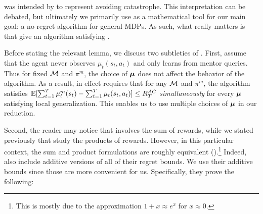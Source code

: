  was intended by \citet{plaut_avoiding_2024} to represent avoiding catastrophe. This interpretation can be debated, but ultimately we primarily use  as a mathematical tool for our main goal: a no-regret algorithm for general MDPs. As such, what really matters is that \citet{plaut_avoiding_2024} give an algorithm satisfying .



Before stating the relevant lemma, we discuss two subtleties of . First, \citet{plaut_avoiding_2024} assume that the agent never observes $\mu_t(s_t,a_t)$ and only learns from mentor queries. Thus for fixed $\mathcal{M}$ and $\pi^m$, the choice of $\boldsymbol{\mu}$ does not affect the behavior of the algorithm. As a result,  in effect requires that for any $\mathcal{M}$ and $\pi^m$, the algorithm satisfies $\operatorname*{\mathbb{E}}[\sum_{t=1}^T \mu_t^m(s_t) - \sum_{t=1}^T \mu_t(s_t, a_t)] \le R_T^{AC}$ \emph{simultaneously} for every $\boldsymbol{\mu}$ satisfying local generalization. This enables us to use multiple choices of $\boldsymbol{\mu}$ in our reduction.

Second, the reader may notice that  involves the sum of rewards, while we stated previously that \citet{plaut_avoiding_2024} study the products of rewards. However, in this particular context, the sum and product formulations are roughly equivalent ().\footnote{This is mostly due to the approximation $1+x \approx e^x$ for $x \approx 0$.} Indeed, \citet{plaut_avoiding_2024} also include additive versions of all of their regret bounds. We use their additive bounds since those are more convenient for us. Specifically, they prove the following:

